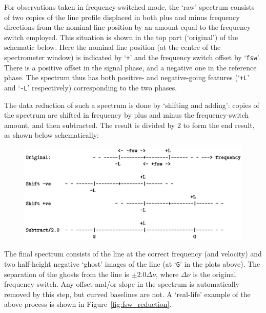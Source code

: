 \documentclass[11pt,twoside]{article}
\begin{document}
For observations taken in frequency-switched mode, the `raw' spectrum
consists of two copies of the line profile displaced in both plus and
minus frequency directions from the nominal line position by an amount
equal to the frequency switch employed. This situation is shown in the
top part (`original') of the schematic below. Here the nominal line
position (at the centre of the spectrometer window) is indicated by
`{\tt{+}}' and the frequency switch offset by `{\tt{fsw}}'. There is a
positive offset in the signal phase, and a negative one in the
reference phase. The spectrum thus has both positive- and
negative-going features (`{\tt{+L}}' and `{\tt{-L}}' respectively)
corresponding to the two phases.

The data reduction of such a spectrum is done by `shifting and
adding': copies of the spectrum are shifted in frequency by plus and
minus the frequency-switch amount, and then subtracted. The result is
divided by 2 to form the end result, as shown below schematically:

\begin{figure}[ht]
\centering
\includegraphics[width=4.5in]{sc8_fsw-fig.ps}
\vspace*{-0.5cm}
\end{figure}

The final spectrum consists of the line at the correct frequency (and
velocity) and two half-height negative `ghost' images of the line (at
`{\tt{G}}' in the plots above). The separation of the ghosts from the
line is $\pm2.0\Delta\nu$, where $\Delta\nu$ is the original
frequency-switch. Any offset and/or slope in the spectrum is
automatically removed by this step, but curved baselines are not. A
`real-life' example of the above process is shown in
Figure~\ref{fig:fsw_reduction}.
\end{document}
